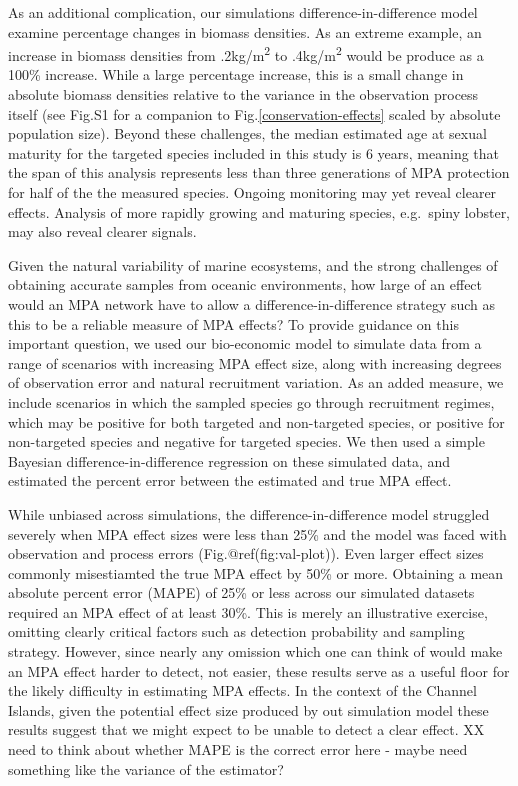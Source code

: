 \documentclass[9pt,twocolumn,twoside,lineno]{pnas-new}
\begin{document}
As an additional complication, our simulations difference-in-difference
model examine percentage changes in biomass densities. As an extreme
example, an increase in biomass densities from .2kg/m\textsuperscript{2}
to .4kg/m\textsuperscript{2} would be produce as a 100\% increase. While
a large percentage increase, this is a small change in absolute biomass
densities relative to the variance in the observation process itself
(see Fig.S1 for a companion to Fig.\ref{conservation-effects} scaled by
absolute population size). Beyond these challenges, the median estimated
age at sexual maturity for the targeted species included in this study
is 6 years, meaning that the span of this analysis represents less than
three generations of MPA protection for half of the the measured
species. Ongoing monitoring may yet reveal clearer effects. Analysis of
more rapidly growing and maturing species, e.g.~spiny lobster, may also
reveal clearer signals.

Given the natural variability of marine ecosystems, and the strong
challenges of obtaining accurate samples from oceanic environments, how
large of an effect would an MPA network have to allow a
difference-in-difference strategy such as this to be a reliable measure
of MPA effects? To provide guidance on this important question, we used
our bio-economic model to simulate data from a range of scenarios with
increasing MPA effect size, along with increasing degrees of observation
error and natural recruitment variation. As an added measure, we include
scenarios in which the sampled species go through recruitment regimes,
which may be positive for both targeted and non-targeted species, or
positive for non-targeted species and negative for targeted species. We
then used a simple Bayesian difference-in-difference regression on these
simulated data, and estimated the percent error between the estimated
and true MPA effect.

While unbiased across simulations, the difference-in-difference model
struggled severely when MPA effect sizes were less than 25\% and the
model was faced with observation and process errors
(Fig.@ref(fig:val-plot)). Even larger effect sizes commonly misestiamted
the true MPA effect by 50\% or more. Obtaining a mean absolute percent
error (MAPE) of 25\% or less across our simulated datasets required an
MPA effect of at least 30\%. This is merely an illustrative exercise,
omitting clearly critical factors such as detection probability and
sampling strategy. However, since nearly any omission which one can
think of would make an MPA effect harder to detect, not easier, these
results serve as a useful floor for the likely difficulty in estimating
MPA effects. In the context of the Channel Islands, given the potential
effect size produced by out simulation model these results suggest that
we might expect to be unable to detect a clear effect. XX need to think
about whether MAPE is the correct error here - maybe need something like
the variance of the estimator?
\end{document}
